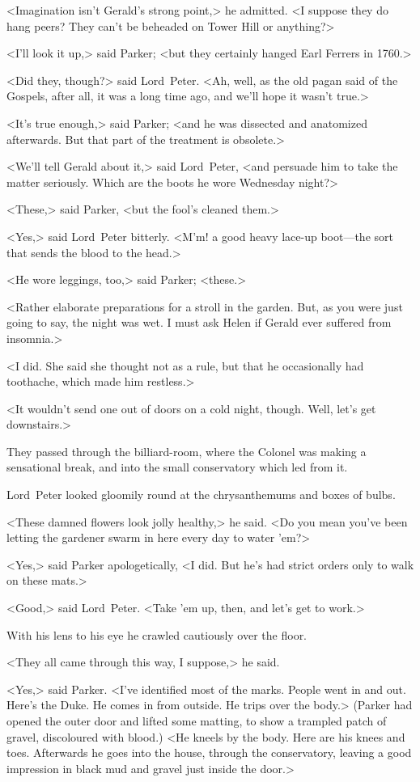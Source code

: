 <Imagination isn't Gerald's strong point,> he admitted. <I suppose they do hang peers? They can't be beheaded on Tower Hill or anything?>

<I'll look it up,> said Parker; <but they certainly hanged Earl Ferrers in 1760.>

<Did they, though?> said Lord~Peter. <Ah, well, as the old pagan said of the Gospels, after all, it was a long time ago, and we'll hope it wasn't true.>

<It's true enough,> said Parker; <and he was dissected and anatomized afterwards. But that part of the treatment is obsolete.>

<We'll tell Gerald about it,> said Lord~Peter, <and persuade him to take the matter seriously. Which are the boots he wore Wednesday night?>

<These,> said Parker, <but the fool's cleaned them.>

<Yes,> said Lord~Peter bitterly. <M'm! a good heavy lace-up boot—the sort that sends the blood to the head.>

<He wore leggings, too,> said Parker; <these.>

<Rather elaborate preparations for a stroll in the garden. But, as you were just going to say, the night was wet. I must ask Helen if Gerald ever suffered from insomnia.>

<I did. She said she thought not as a rule, but that he occasionally had toothache, which made him restless.>

<It wouldn't send one out of doors on a cold night, though. Well, let's get downstairs.>

They passed through the billiard-room, where the Colonel was making a sensational break, and into the small conservatory which led from it.

Lord~Peter looked gloomily round at the chrysanthemums and boxes of bulbs.

<These damned flowers look jolly healthy,> he said. <Do you mean you've been letting the gardener swarm in here every day to water 'em?>

<Yes,> said Parker apologetically, <I did. But he's had strict orders only to walk on these mats.>

<Good,> said Lord~Peter. <Take 'em up, then, and let's get to work.>

With his lens to his eye he crawled cautiously over the floor.

<They all came through this way, I suppose,> he said.

<Yes,> said Parker. <I've identified most of the marks. People went in and out. Here's the Duke. He comes in from outside. He trips over the body.> (Parker had opened the outer door and lifted some matting, to show a trampled patch of gravel, discoloured with blood.) <He kneels by the body. Here are his knees and toes. Afterwards he goes into the house, through the conservatory, leaving a good impression in black mud and gravel just inside the door.>

